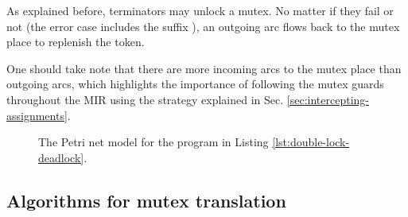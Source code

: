 As explained before,  terminators may unlock a mutex.
No matter if they fail or not (the error case includes the suffix ),
an outgoing arc flows back to the mutex place to replenish the token.

One should take note that there are more incoming arcs to the mutex place than outgoing arcs,
which highlights the importance of following the mutex guards throughout the \acrshort{MIR}
using the strategy explained in Sec. \ref{sec:intercepting-assignments}.

\begin{figure}[!htbp]
  \centering
  
  \caption{The Petri net model for the program in Listing \ref{lst:double-lock-deadlock}.}
  \label{fig:mutex-example}
\end{figure}

\subsection{Algorithms for mutex translation}
\label{sec:mutex-algorithms}